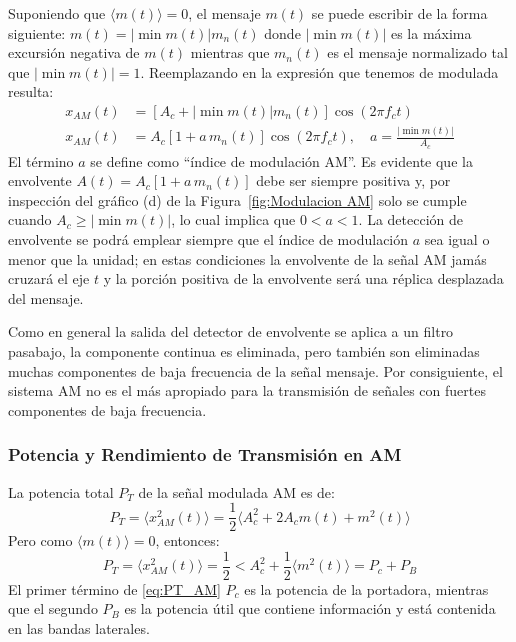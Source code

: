 \documentclass[11pt,a4paper]{article}
\numberwithin{equation}{section}
\begin{document}
Suponiendo que $\langle m(t)\rangle =0$, el mensaje $m(t)$ se puede escribir de la forma siguiente: $m(t)= \lvert \min m(t) \rvert m_n(t)$ donde $\lvert \min m(t) \rvert$ es la máxima excursión negativa de $m(t)$ mientras que $m_n(t)$ es el mensaje normalizado tal que $\lvert \min m(t) \rvert = 1$. Reemplazando en la expresión que tenemos de modulada resulta:
\begin{equation}
  \begin{aligned}
    x_{AM}(t)&=[A_c + \lvert \min m(t) \rvert m_n(t)]\cos(2\pi f_ct)\\
    x_{AM}(t)&=A_c[1 + a\,m_n(t)]\cos(2\pi f_ct),\quad a=\frac{\lvert \min m(t) \rvert}{A_c}
  \end{aligned}
\end{equation}
El término $a$ se define como “índice de modulación AM”. Es evidente que la envolvente $A(t) = A_c[1 + a\,m_n(t)]$ debe ser siempre positiva y, por inspección del gráfico (d) de la Figura~\ref{fig:Modulacion AM} solo se cumple cuando $A_c \geq \lvert \min m(t) \rvert$, lo cual implica que $0<a<1$. La detección de envolvente se podrá emplear siempre que el índice de modulación $a$ sea igual o menor que la unidad; en estas condiciones la envolvente de la señal AM jamás cruzará el eje $t$ y la porción positiva de la envolvente será una réplica desplazada del mensaje.

Como en general la salida del detector de envolvente se aplica a un filtro pasabajo, la componente continua es eliminada, pero también son eliminadas muchas componentes de baja frecuencia de la señal mensaje. Por consiguiente, el sistema AM no es el más apropiado para la transmisión de señales con fuertes componentes de baja frecuencia.

\subsubsection{Potencia y Rendimiento de Transmisión en AM}
La potencia total $P_T$ de la señal modulada AM es de:
\begin{equation}
  P_T=\langle x_{AM}^2(t)\rangle =\frac{1}{2}\langle A_c^2 + 2A_cm(t) + m^2(t)\rangle 
\end{equation}
Pero como $\langle m(t)\rangle  = 0$, entonces:
\begin{equation}\label{eq:PT_AM}
  P_T=\langle x_{AM}^2(t)\rangle =\frac{1}{2}<A_c^2 +\frac{1}{2}\langle m^2(t)\rangle =P_c+P_B
\end{equation}
El primer término de \eqref{eq:PT_AM} $P_c$ es la potencia de la portadora, mientras que el segundo $P_B$ es la potencia útil que contiene información y está contenida en las bandas laterales.
\end{document}
